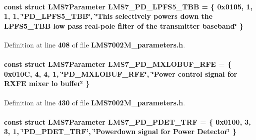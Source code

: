 \paragraph[{L\+M\+S7\+\_\+\+P\+D\+\_\+\+L\+P\+F\+S5\+\_\+\+T\+BB}]{\setlength{\rightskip}{0pt plus 5cm}const struct {\bf L\+M\+S7\+Parameter} L\+M\+S7\+\_\+\+P\+D\+\_\+\+L\+P\+F\+S5\+\_\+\+T\+BB = \{ 0x0105, 1, 1, 1, \char`\"{}\+P\+D\+\_\+\+L\+P\+F\+S5\+\_\+\+T\+B\+B\char`\"{}, \char`\"{}\+This selectively powers down the L\+P\+F\+S5\+\_\+\+T\+B\+B low pass real-\/pole filter of the transmitter baseband\char`\"{} \}\hspace{0.3cm}{\ttfamily [static]}}\label{LMS7002M__parameters_8h_ab4d564664fe667a38739e411da5d1894}


Definition at line {\bf 408} of file {\bf L\+M\+S7002\+M\+\_\+parameters.\+h}.

\paragraph[{L\+M\+S7\+\_\+\+P\+D\+\_\+\+M\+X\+L\+O\+B\+U\+F\+\_\+\+R\+FE}]{\setlength{\rightskip}{0pt plus 5cm}const struct {\bf L\+M\+S7\+Parameter} L\+M\+S7\+\_\+\+P\+D\+\_\+\+M\+X\+L\+O\+B\+U\+F\+\_\+\+R\+FE = \{ 0x010\+C, 4, 4, 1, \char`\"{}\+P\+D\+\_\+\+M\+X\+L\+O\+B\+U\+F\+\_\+\+R\+F\+E\char`\"{}, \char`\"{}\+Power control signal for R\+X\+F\+E mixer lo buffer\char`\"{} \}\hspace{0.3cm}{\ttfamily [static]}}\label{LMS7002M__parameters_8h_ac8d4a6bedb6e12a21937605d20158b62}


Definition at line {\bf 430} of file {\bf L\+M\+S7002\+M\+\_\+parameters.\+h}.

\paragraph[{L\+M\+S7\+\_\+\+P\+D\+\_\+\+P\+D\+E\+T\+\_\+\+T\+RF}]{\setlength{\rightskip}{0pt plus 5cm}const struct {\bf L\+M\+S7\+Parameter} L\+M\+S7\+\_\+\+P\+D\+\_\+\+P\+D\+E\+T\+\_\+\+T\+RF = \{ 0x0100, 3, 3, 1, \char`\"{}\+P\+D\+\_\+\+P\+D\+E\+T\+\_\+\+T\+R\+F\char`\"{}, \char`\"{}\+Powerdown signal for Power Detector\char`\"{} \}\hspace{0.3cm}{\ttfamily [static]}}\label{LMS7002M__parameters_8h_a81f5b619e849b214e96384c2bb61a5ff}



